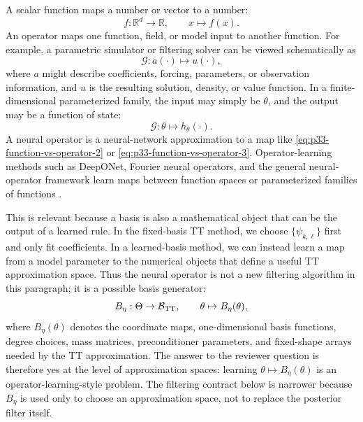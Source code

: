 \documentclass[11pt]{article}
\numberwithin{equation}{section}
\begin{document}
A scalar function maps a number or vector to a number:
\begin{equation}
    f:\mathbb R^d\to\mathbb R,
    \qquad
    x\mapsto f(x).
    \label{eq:p33-function-vs-operator-1}
\end{equation}
An operator maps one function, field, or model input to another function.  For
example, a parametric simulator or filtering solver can be viewed schematically
as
\begin{equation}
    \mathcal G:
    a(\cdot)\mapsto u(\cdot),
    \label{eq:p33-function-vs-operator-2}
\end{equation}
where \(a\) might describe coefficients, forcing, parameters, or observation
information, and \(u\) is the resulting solution, density, or value function.
In a finite-dimensional parameterized family, the input may simply be
\(\theta\), and the output may be a function of state:
\begin{equation}
    \mathcal G:
    \theta\mapsto h_\theta(\cdot).
    \label{eq:p33-function-vs-operator-3}
\end{equation}
A neural operator is a neural-network approximation to a map like
\eqref{eq:p33-function-vs-operator-2} or
\eqref{eq:p33-function-vs-operator-3}.  Operator-learning methods such as
DeepONet, Fourier neural operators, and the general neural-operator framework
learn maps between function spaces or parameterized families of functions
\cite{lu2021deeponet,li2021fourier,kovachki2023neuraloperator}.

This is relevant because a basis is also a mathematical object that can be the
output of a learned rule.  In the fixed-basis TT method, we choose
\(\{\psi_{k,\ell}\}\) first and only fit coefficients.  In a learned-basis
method, we can instead learn a map from a model parameter to the numerical
objects that define a useful TT approximation space.  Thus the neural operator
is not a new filtering algorithm in this paragraph; it is a possible basis
generator:
\begin{equation}
    B_\eta:\Theta\to\mathcal B_{\rm TT},
    \qquad
    \theta\mapsto B_\eta(\theta),
    \label{eq:p33-neural-basis-map}
\end{equation}
where \(B_\eta(\theta)\) denotes the coordinate maps, one-dimensional basis
functions, degree choices, mass matrices, preconditioner parameters, and
fixed-shape arrays needed by the TT approximation.
The answer to the reviewer question is therefore yes at the level of
approximation spaces: learning \(\theta\mapsto B_\eta(\theta)\) is an
operator-learning-style problem.  The filtering contract below is narrower
because \(B_\eta\) is used only to choose an approximation space, not to replace
the posterior filter itself.
\end{document}
